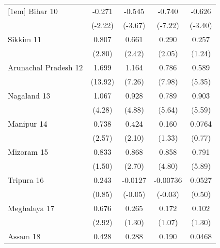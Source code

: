 {\begin{tabular}{l*{4}{c}}
[1em]
Bihar 10            &      -0.271\sym{*}  &      -0.545\sym{***}&      -0.740\sym{***}&      -0.626\sym{***}\\
                    &     (-2.22)         &     (-3.67)         &     (-7.22)         &     (-3.40)         \\
[1em]
Sikkim 11           &       0.807\sym{**} &       0.661\sym{*}  &       0.290\sym{*}  &       0.257         \\
                    &      (2.80)         &      (2.42)         &      (2.05)         &      (1.24)         \\
[1em]
Arunachal Pradesh 12&       1.699\sym{***}&       1.164\sym{***}&       0.786\sym{***}&       0.589\sym{***}\\
                    &     (13.92)         &      (7.26)         &      (7.98)         &      (5.35)         \\
[1em]
Nagaland 13         &       1.067\sym{***}&       0.928\sym{***}&       0.789\sym{***}&       0.903\sym{***}\\
                    &      (4.28)         &      (4.88)         &      (5.64)         &      (5.59)         \\
[1em]
Manipur 14          &       0.738\sym{*}  &       0.424\sym{*}  &       0.160         &      0.0764         \\
                    &      (2.57)         &      (2.10)         &      (1.33)         &      (0.77)         \\
[1em]
Mizoram 15          &       0.833         &       0.868\sym{**} &       0.858\sym{***}&       0.791\sym{***}\\
                    &      (1.50)         &      (2.70)         &      (4.80)         &      (5.89)         \\
[1em]
Tripura 16          &       0.243         &     -0.0127         &    -0.00736         &      0.0527         \\
                    &      (0.85)         &     (-0.05)         &     (-0.03)         &      (0.50)         \\
[1em]
Meghalaya 17        &       0.676\sym{**} &       0.265         &       0.172         &       0.102         \\
                    &      (2.92)         &      (1.30)         &      (1.07)         &      (1.30)         \\
[1em]
Assam 18            &       0.428\sym{***}&       0.288         &       0.190         &      0.0468         \\

\end{tabular}}
